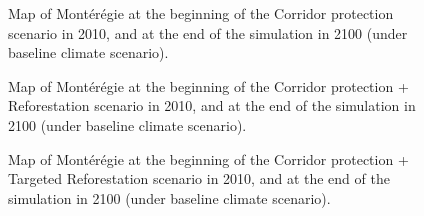 
\begin{figure}[h!]
  \caption[Map of Montérégie at the beginning of the Corridor protection scenario in 2010, and at the end in 2100 (baseline climate scenario)]{Map of Montérégie at the beginning of the Corridor protection scenario in 2010, and at the end of the simulation in 2100 (under baseline climate scenario).}
 \label{fig:Corr_compare}
\end{figure}

\begin{figure}[h!]
  \caption[Map of Montérégie at the beginning of the Corridor protection + Reforestation scenario in 2010, and at the end in 2100 (baseline climate scenario)]{Map of Montérégie at the beginning of the Corridor protection + Reforestation scenario in 2010, and at the end of the simulation in 2100 (under baseline climate scenario).}
 \label{fig:	CorrRef_compare}
\end{figure}

\begin{figure}[h!]
  \caption[Map of Montérégie at the beginning of the Corridor protection + Targeted Reforestation scenario in 2010, and at the end in 2100 (baseline climate scenario)]{Map of Montérégie at the beginning of the Corridor protection + Targeted Reforestation scenario in 2010, and at the end of the simulation in 2100 (under baseline climate scenario).}
 \label{fig:	CorrRefT_compare}
\end{figure}



